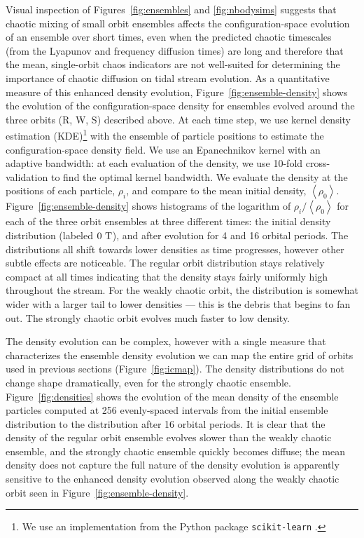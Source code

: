 \documentclass[letterpaper,12pt,preprint]{aastex}
\newcommand{\mean}[1]{\left< #1 \right>}
\newcommand{\periods}{\ensuremath{{\rm T}}}
\begin{document}
Visual inspection of Figures~\ref{fig:ensembles} and \ref{fig:nbodysims} suggests that chaotic mixing of small orbit ensembles affects the configuration-space evolution of an ensemble over short times, even when the predicted chaotic timescales (from the Lyapunov and frequency diffusion times) are long and therefore that the mean, single-orbit chaos indicators are not well-suited for determining the importance of chaotic diffusion on tidal stream evolution. As a quantitative measure of this enhanced density evolution, Figure~\ref{fig:ensemble-density} shows the evolution of the configuration-space density for ensembles evolved around the three orbits (R, W, S) described above. At each time step, we use kernel density estimation (KDE)\footnote{We use an implementation from the Python package \texttt{scikit-learn} \citep{scikitlearn}.} with the ensemble of particle positions to estimate the configuration-space density field. We use an Epanechnikov kernel with an adaptive bandwidth: at each evaluation of the density, we use 10-fold cross-validation to find the optimal kernel bandwidth. We evaluate the density at the positions of each particle, $\rho_i$, and compare to the mean initial density, $\mean{\rho_0}$. Figure~\ref{fig:ensemble-density} shows histograms of the logarithm of $\rho_i/\mean{\rho_0}$ for each of the three orbit ensembles at three different times: the initial density distribution (labeled $0~\periods$), and after evolution for 4 and 16 orbital periods. The distributions all shift towards lower densities as time progresses, however other subtle effects are noticeable. The regular orbit distribution stays relatively compact at all times indicating that the density stays fairly uniformly high throughout the stream. For the weakly chaotic orbit, the distribution is somewhat wider with a larger tail to lower densities --- this is the debris that begins to fan out. The strongly chaotic orbit evolves much faster to low density. 

The density evolution can be complex, however with a single measure that characterizes the ensemble density evolution we can map the entire grid of orbits used in previous sections (Figure~\ref{fig:icmap}). The density distributions do not change shape dramatically, even for the strongly chaotic ensemble. Figure~\ref{fig:densities} shows the evolution of the mean density of the ensemble particles computed at 256 evenly-spaced intervals from the initial ensemble distribution to the distribution after 16 orbital periods. It is clear that the density of the regular orbit ensemble evolves slower than the weakly chaotic ensemble, and the strongly chaotic ensemble quickly becomes diffuse; the mean density does not capture the full nature of the density evolution is apparently sensitive to the enhanced density evolution observed along the weakly chaotic orbit seen in Figure~\ref{fig:ensemble-density}.
\end{document}

